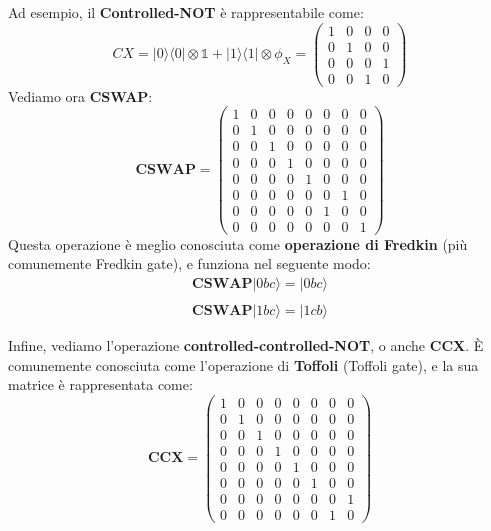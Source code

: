 \begin{itemize}
Ad esempio, il \textbf{Controlled-NOT} è rappresentabile come:
\begin{equation*}
    CX = |0\rangle\langle0| \otimes \mathbb{1} + |1\rangle\langle1| \otimes \phi_X = \left(\begin{array}{cccc}
        1 & 0 & 0 & 0 \\
        0 & 1 & 0 & 0 \\
        0 & 0 & 0 & 1 \\
        0 & 0 & 1 & 0 
    \end{array}\right)
\end{equation*}
Vediamo ora \textbf{CSWAP}:
\begin{equation*}
    \textbf{CSWAP} = \left(\begin{array}{cccccccc}
         1 & 0 & 0 & 0 & 0 & 0 & 0 & 0   \\
         0 & 1 & 0 & 0 & 0 & 0 & 0 & 0   \\
         0 & 0 & 1 & 0 & 0 & 0 & 0 & 0   \\
         0 & 0 & 0 & 1 & 0 & 0 & 0 & 0   \\
         0 & 0 & 0 & 0 & 1 & 0 & 0 & 0   \\
         0 & 0 & 0 & 0 & 0 & 0 & 1 & 0   \\
         0 & 0 & 0 & 0 & 0 & 1 & 0 & 0   \\
         0 & 0 & 0 & 0 & 0 & 0 & 0 & 1   
    \end{array}\right)
\end{equation*}
Questa operazione è meglio conosciuta come \textbf{operazione di Fredkin} (più comunemente Fredkin gate), e funziona nel seguente modo:
\begin{equation*}
    \begin{array}{c}
         \textbf{CSWAP}|0bc\rangle = |0bc\rangle  \\ \\
         \textbf{CSWAP}|1bc\rangle = |1cb\rangle 
    \end{array}
\end{equation*}

Infine, vediamo l'operazione \textbf{controlled-controlled-NOT}, o anche \textbf{CCX}. È comunemente conosciuta come l'operazione di \textbf{Toffoli} (Toffoli gate), e la sua matrice è rappresentata come:
\begin{equation*}
    \textbf{CCX} = \left(\begin{array}{cccccccc}
         1 & 0 & 0 & 0 & 0 & 0 & 0 & 0   \\
         0 & 1 & 0 & 0 & 0 & 0 & 0 & 0   \\
         0 & 0 & 1 & 0 & 0 & 0 & 0 & 0   \\
         0 & 0 & 0 & 1 & 0 & 0 & 0 & 0   \\
         0 & 0 & 0 & 0 & 1 & 0 & 0 & 0   \\
         0 & 0 & 0 & 0 & 0 & 1 & 0 & 0   \\
         0 & 0 & 0 & 0 & 0 & 0 & 0 & 1   \\
         0 & 0 & 0 & 0 & 0 & 0 & 1 & 0   
    \end{array}\right)
\end{equation*}
\end{itemize} 
\newpage
